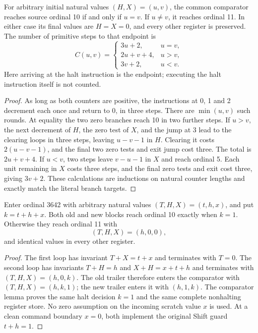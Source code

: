 \begin{lemma}
For arbitrary initial natural values $(H,X)=(u,v)$, the common comparator
reaches source ordinal 10 if and only if $u=v$.  If $u\ne v$, it reaches
ordinal 11.  In either case its final values are $H=X=0$, and every other
register is preserved.  The number of primitive steps to that endpoint is
\[
 C(u,v)=
 \begin{cases}
 3u+2,&u=v,\\
 2u+v+4,&u>v,\\
 3v+2,&u<v.
 \end{cases}
\]
Here arriving at the halt instruction is the endpoint; executing the halt
instruction itself is not counted.
\end{lemma}
\begin{proof}
As long as both counters are positive, the instructions at 0, 1 and 2
decrement each once and return to 0, in three steps.  There are
$\min(u,v)$ such rounds.  At equality the two zero branches reach 10 in
two further steps.  If $u>v$, the next decrement of $H$, the zero test of
$X$, and the jump at 3 lead to the clearing loops in three steps, leaving
$u-v-1$ in $H$.  Clearing it costs $2(u-v-1)$, and the final two zero tests
and exit jump cost three.  The total is $2u+v+4$.
If $u<v$, two steps leave $v-u-1$ in $X$ and reach ordinal 5.  Each unit
remaining in $X$ costs three steps, and the final zero tests and exit cost
three, giving $3v+2$.  These calculations are inductions on natural
counter lengths and exactly match the literal branch targets.
\end{proof}

\begin{lemma}
Enter ordinal 3642 with arbitrary natural values $(T,H,X)=(t,h,x)$,
and put $k=t+h+x$.  Both old and new blocks reach ordinal 10 exactly when
$k=1$.  Otherwise they reach ordinal 11 with
\[
                   (T,H,X)=(h,0,0),
\]
and identical values in every other register.
\end{lemma}
\begin{proof}
The first loop has invariant $T+X=t+x$ and terminates with $T=0$.
The second loop has invariants $T+H=h$ and $X+H=x+t+h$ and terminates
with $(T,H,X)=(h,0,k)$.  The old trailer therefore enters the comparator
with $(T,H,X)=(h,k,1)$; the new trailer enters it with $(h,1,k)$.
The comparator lemma proves the same halt decision $k=1$ and the same
complete nonhalting register store.  No zero assumption on the incoming
scratch value $x$ is used.  At a clean command boundary $x=0$, both
implement the original Shift guard $t+h=1$.
\end{proof}

